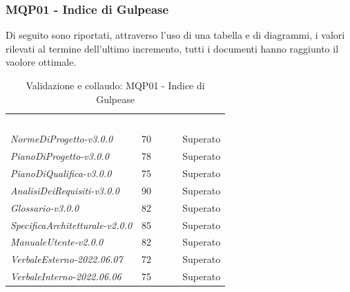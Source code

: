 \subsubsection{MQP01 - Indice di Gulpease}
Di seguito sono riportati, attraverso l'uso di una tabella e di diagrammi, i valori rilevati al termine dell'ultimo incremento, tutti i documenti hanno raggiunto il vaolore ottimale.
\begin{table}[H]
        \renewcommand{\arraystretch}{1.5}
        \begin{tabular}{m{}<{\centering}  m{}<{\centering}  m{}<{\centering} }
            \rowcolor{darkblue}
            \textcolor{white}{\textbf{Documento}}& \textcolor{white}{\textbf{Valore}} & \textcolor{white}{\textbf{Esito}}\\ 

            \textit{NormeDiProgetto-v3.0.0} &
            70 &
            Superato \\

            \textit{PianoDiProgetto-v3.0.0} &
            78 &
            Superato \\

            \textit{PianoDiQualifica-v3.0.0} &
            75 &
            Superato \\

            \textit{AnalisiDeiRequisiti-v3.0.0} &
            90 &
            Superato \\
            
            \textit{Glossario-v3.0.0} &
            82 &
            Superato \\
            \textit{SpecificaArchitetturale-v2.0.0} &
            85 &
            Superato \\
            \textit{ManualeUtente-v2.0.0} &
            82 &
            Superato \\

            \textit{VerbaleEsterno-2022.06.07} &
            72 &
            Superato \\
          
            \textit{VerbaleInterno-2022.06.06} &
            75&
            Superato \\
    \end{tabular}
    \caption{Validazione e collaudo: MQP01 - Indice di Gulpease}
\end{table}
